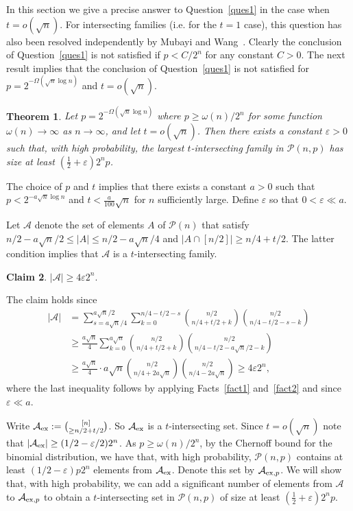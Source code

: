 \documentclass[11pt]{article}
\newtheorem{theorem}{Theorem}[section]
\newtheorem{claim}[theorem]{Claim}
\numberwithin{equation}{section}
\def\P{\mathcal{P}}
\def\eps{\varepsilon}
\begin{document}
In this section we give a precise answer to Question~\ref{ques1} in the case when $t=o(\sqrt{n})$. 
For intersecting families (i.e. for the $t=1$ case), this question has also been resolved independently by Mubayi and  Wang~\cite{dhruv}.
Clearly the conclusion of Question~\ref{ques1} is not satisfied if $p<C/2^{n}$ for any constant $C>0$. The next result implies that the conclusion of Question~\ref{ques1} is not satisfied for $p=2^{-\Omega (\sqrt{n}\log n)}$ and $t=o(\sqrt{n})$.
\begin{theorem}\label{katlower}
Let $p=2^{-\Omega (\sqrt{n}\log n)}$ where $p\geq \omega (n)/2^{n}$ for some function $\omega (n)\rightarrow \infty$ as $n \rightarrow \infty$, and let $t=o(\sqrt{n})$. Then there exists a constant $\eps>0$ such that, with high probability, the largest $t$-intersecting family in $\mathcal P(n,p)$ has size at least $(\frac{1}{2}+\eps)2^np$.
\end{theorem}
\proof
The choice of $p$ and $t$ implies that there exists a constant $a>0$ such that $p<2^{-a\sqrt{n}\log n}$ and $t<\frac{a}{100}\sqrt{n}$ for $n$ sufficiently large. %
Define $\eps$ so that $0<\eps \ll a$.

Let $\mathcal A$ denote the set of elements $A$ of $\mathcal P(n)$ that satisfy $n/2-a\sqrt{n}/2 \leq |A| \leq n/2-a\sqrt{n}/4$ and $|A\cap[n/2]|\geq n/4+t/2$. The latter condition implies that $\mathcal A$ is a $t$-intersecting family.
\begin{claim}\label{aclaim}
$|\mathcal A| \geq 4\eps 2^n.$
\end{claim}
The claim holds since
\begin{equation*}
\begin{split}
|\mathcal{A}|&=\sum_{s=a\sqrt{n}/4}^{a\sqrt{n}/2}\sum_{k=0} ^{n/4-t/2-s} \binom{n/2}{n/4+t/2+k}\binom{n/2}{n/4-t/2-s-k}\\
& \geq \frac{a\sqrt{n}}{4} \sum_{k=0} ^{a\sqrt{n}} \binom{n/2}{n/4+t/2+k}\binom{n/2}{n/4-t/2-a\sqrt{n}/2-k} \\
& \geq \frac{a\sqrt{n}}{4}  \cdot a\sqrt{n} \binom{n/2}{n/4+2a\sqrt{n}}\binom{n/2}{n/4-2a\sqrt{n}} \geq 4\eps 2^n,
\end{split}
\end{equation*}
where the last inequality follows by applying Facts~\ref{fact1} and~\ref{fact2} and since $\eps \ll a$.

\smallskip

Write $\mathcal A_{\rm ex}:=\binom{[n]}{\geq n/2+t/2}$. So $\mathcal A_{\rm ex}$ is a $t$-intersecting set.
Since $t =o(\sqrt{n})$ note that $|\mathcal A_{\rm ex}|\geq (1/2-\eps/2)2^n$. As $p\geq \omega(n)/2^n$,
by the Chernoff bound for the binomial distribution, we have that, with high probability, 
$\P(n, p)$ contains at least $(1/2-\eps)p2^n$ elements from $\mathcal A_{\rm ex}$. Denote this set by $\mathcal A_{{\rm ex},p}$. 
We will show that, with high probability, we can add a significant number of elements from $\mathcal A$ to $\mathcal A_{{\rm ex},p}$ to obtain a $t$-intersecting set in $\P(n,p)$ of size at least $(\frac{1}{2}+\eps)2^np$.
\end{document}
